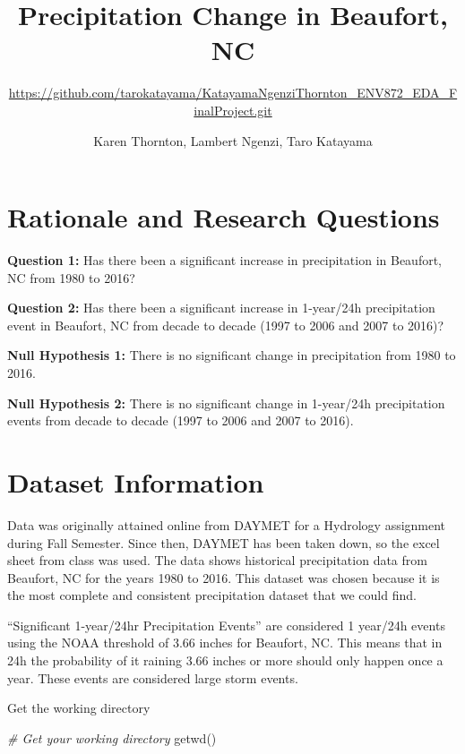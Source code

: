 \documentclass[
  12pt,
]{article}
\title{Precipitation Change in Beaufort, NC}
\subtitle{\url{https://github.com/tarokatayama/KatayamaNgenziThornton_ENV872_EDA_FinalProject.git}}
\author{Karen Thornton, Lambert Ngenzi, Taro Katayama}
\date{}
\newenvironment{Shaded}{\begin{snugshade}}{\end{snugshade}}
\newcommand{\CommentTok}[1]{\textcolor[rgb]{0.56,0.35,0.01}{\textit{#1}}}
\newcommand{\FunctionTok}[1]{\textcolor[rgb]{0.00,0.00,0.00}{#1}}
\newcommand{\NormalTok}[1]{#1}
\begin{document}
\maketitle

\newpage
\tableofcontents 
\newpage
\listoftables 
\newpage
\listoffigures 
\newpage

\hypertarget{rationale-and-research-questions}{%
\section{Rationale and Research
Questions}\label{rationale-and-research-questions}}

\textbf{Question 1:} Has there been a significant increase in
precipitation in Beaufort, NC from 1980 to 2016?

\textbf{Question 2:} Has there been a significant increase in 1-year/24h
precipitation event in Beaufort, NC from decade to decade (1997 to 2006
and 2007 to 2016)?

\textbf{Null Hypothesis 1:} There is no significant change in
precipitation from 1980 to 2016.

\textbf{Null Hypothesis 2:} There is no significant change in 1-year/24h
precipitation events from decade to decade (1997 to 2006 and 2007 to
2016).

\newpage

\hypertarget{dataset-information}{%
\section{Dataset Information}\label{dataset-information}}

Data was originally attained online from DAYMET for a Hydrology
assignment during Fall Semester. Since then, DAYMET has been taken down,
so the excel sheet from class was used. The data shows historical
precipitation data from Beaufort, NC for the years 1980 to 2016. This
dataset was chosen because it is the most complete and consistent
precipitation dataset that we could find.

``Significant 1-year/24hr Precipitation Events'' are considered 1
year/24h events using the NOAA threshold of 3.66 inches for Beaufort,
NC. This means that in 24h the probability of it raining 3.66 inches or
more should only happen once a year. These events are considered large
storm events.

Get the working directory

\begin{Shaded}
\begin{Highlighting}[]
\CommentTok{\# Get your working directory}
\FunctionTok{getwd}\NormalTok{()}
\end{Highlighting}
\end{Shaded}
\end{document}
